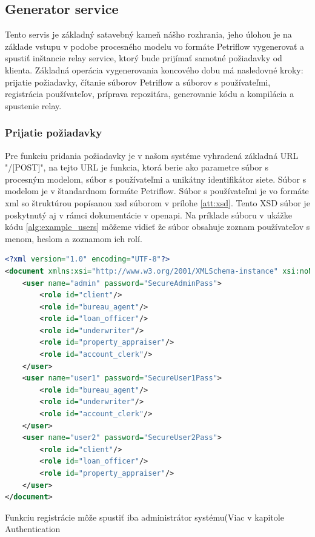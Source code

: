 \subsection{Generator service}  
Tento servis je základný satavebný kameň nášho rozhrania, jeho úlohou je na základe vstupu v podobe procesného modelu vo formáte Petriflow vygenerovať a spustiť inštancie relay service, ktorý bude prijímať samotné požiadavky od klienta. Základná operácia vygenerovania koncového dobu má nasledovné kroky:  
prijatie požiadavky,  
čítanie súborov Petriflow a súborov s používateľmi,  
registrácia používateľov, 
príprava repozitára, 
generovanie kódu  
a kompilácia a spustenie relay. 



\subsubsection{Prijatie požiadavky} 
Pre funkciu pridania požiadavky je v našom systéme vyhradená základná URL "/[POST]", na tejto URL je funkcia, ktorá berie ako parametre súbor s procesným modelom, súbor s používateľmi a unikátny identifikátor siete. Súbor s modelom je v štandardnom formáte Petriflow. Súbor s používateľmi je vo formáte \acrshort{xml} so štruktúrou popísanou \acrshort{xsd} súborom v prílohe \ref{att:xsd}. Tento XSD súbor je poskytnutý aj v rámci dokumentácie v \acrshort{openapi}. Na príklade súboru v ukážke kódu \ref{alg:example_users} môžeme vidieť že súbor obsahuje zoznam používateľov s menom, heslom a zoznamom ich rolí. 



\begin{lstlisting}[float, caption={Príklad súboru s používateľmi},label={alg:example_users},language=XML] 
<?xml version="1.0" encoding="UTF-8"?> 
<document xmlns:xsi="http://www.w3.org/2001/XMLSchema-instance" xsi:noNamespaceSchemaLocation="./users_schema.xsd"> 
	<user name="admin" password="SecureAdminPass"> 
		<role id="client"/> 
		<role id="bureau_agent"/> 
		<role id="loan_officer"/> 
		<role id="underwriter"/> 
		<role id="property_appraiser"/> 
		<role id="account_clerk"/> 
	</user> 
	<user name="user1" password="SecureUser1Pass"> 
		<role id="bureau_agent"/> 
		<role id="underwriter"/> 
		<role id="account_clerk"/> 
	</user> 
	<user name="user2" password="SecureUser2Pass"> 
		<role id="client"/> 
		<role id="loan_officer"/> 
		<role id="property_appraiser"/> 
	</user> 
</document> 
\end{lstlisting} 

Funkciu registrácie môže spustiť iba administrátor systému(Viac v kapitole Authentication %

